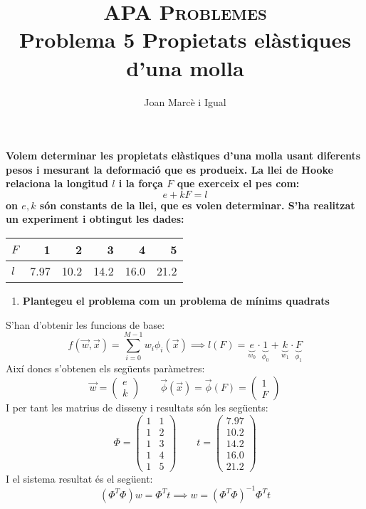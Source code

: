 \documentclass[a4paper]{article}
\title{\textsc{APA Problemes} \\ Problema 5 Propietats elàstiques d'una molla}
\author{Joan Marcè i Igual}
\date{}
\begin{document}
\maketitle

\textbf{Volem determinar les propietats elàstiques d'una molla usant diferents pesos i mesurant la deformació que es produeix. La llei de Hooke relaciona la longitud $l$ i la força $F$ que exerceix el pes com:}
$$
e + kF = l
$$
\textbf{on $e,k$ són constants de la llei, que es volen determinar. S'ha realitzat un experiment i obtingut les dades:}
\begin{table}[H]
	\centering
	\begin{tabular}{l|rrrrr}
		$F$ & 1 & 2 & 3 & 4 & 5 \\
		\hline
		$l$ & 7.97 & 10.2 & 14.2 & 16.0 & 21.2
	\end{tabular}
\end{table}

\begin{enumerate}
	\item \textbf{Plantegeu el problema com un problema de mínims quadrats}
\end{enumerate}
S'han d'obtenir les funcions de base:
$$
f(\vec{w}, \vec{x}) = \sum_{i=0}^{M-1} w_i \phi_i(\vec{x}) \implies l(F) =
\underbrace{e}_{w_0}·\underbrace{1}_{\phi_0} +
\underbrace{k}_{w_1}·\underbrace{F}_{\phi_1} 
$$
Així doncs s'obtenen els següents paràmetres:
$$
\vec{w} = 
\begin{pmatrix}
e \\
k
\end{pmatrix}
\qquad
\vec{\phi}(\vec{x}) = \vec{\phi}(F) =
\begin{pmatrix}
1 \\
F
\end{pmatrix}
$$
I per tant les matrius de disseny i resultats són les següents:
$$
\Phi = 
\begin{pmatrix}
1 & 1 \\
1 & 2 \\
1 & 3 \\
1 & 4 \\
1 & 5
\end{pmatrix}
\qquad
t = 
\begin{pmatrix}
7.97 \\
10.2 \\
14.2 \\
16.0 \\
21.2
\end{pmatrix}
$$
I el sistema resultat és el següent:
$$
(\Phi^T\Phi)w = \Phi^T t \implies w = (\Phi^T\Phi)^{-1} \Phi^T t 
$$
\end{document}
